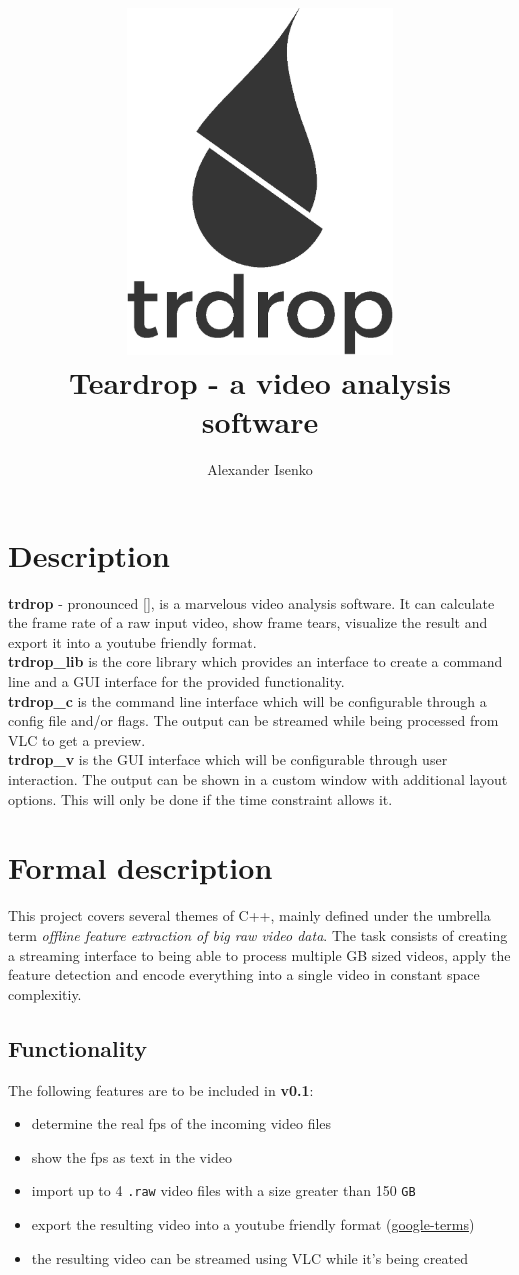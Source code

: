 \documentclass[titlepage]{article}
\title{\includegraphics[width=200pt, height=260pt]{../../images/trdrop_logo_text.eps} \\[50pt]
Teardrop - a video analysis software}
\author{Alexander Isenko}
\date{}
\begin{document}
\maketitle

\newpage

\section{Description}

\textbf{trdrop} - pronounced [\textit{}], is a marvelous video analysis software. It can calculate the frame rate of a raw input video, show frame tears, visualize the result and export it into a youtube friendly format. \\[2mm]
\hfill
\textbf{trdrop\_lib} is the core library which provides an interface to create a command line and a GUI interface for the provided functionality. \\[2mm]
\hfill
\textbf{trdrop\_c} is the command line interface which will be configurable through a config file and/or flags. The output can be streamed while being processed from VLC to get a preview. \\[2mm]
\hfill
\textbf{trdrop\_v} is the GUI interface which will be configurable through user interaction. The output can be shown in a custom window with additional layout options. This will only be done if the time constraint allows it.

\section{Formal description}

This project covers several themes of C++, mainly defined under the umbrella term \textit{offline feature extraction of big raw video data}. The task consists of creating a streaming interface to being able to process multiple GB sized videos, apply the feature detection and encode everything into a single video in constant space complexitiy.

\subsection{Functionality}

The following features are to be included in \textbf{v0.1}:

\begin{itemize}
    \item determine the real fps of the incoming video files
    \item show the fps as text in the video
    \item import up to 4 \texttt{.raw} video files with a size greater than 150 \texttt{GB}
    \item export the resulting video into a youtube friendly format (\href{https://support.google.com/youtube/answer/1722171}{google-terms})
    \item the resulting video can be streamed using VLC while it's being created
\end{itemize}
\end{document}
